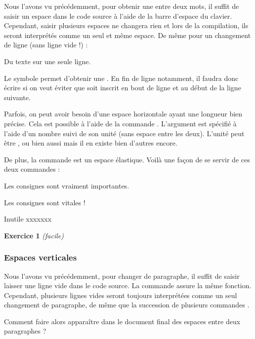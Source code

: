 Nous l'avons vu précédemment, pour obtenir une  entre deux mots, il suffit de saisir un espace dans le code source à l'aide de la barre d'espace du clavier. Cependant, saisir plusieurs espaces ne changera rien et lors de la compilation, ils seront interprétés comme un seul et même espace. De même pour un changement de ligne (sans ligne vide !) :\medskip

{\NewFont
\begin{SideBySideExample}[showspaces=true]
    Du texte
        sur une
    seule          ligne.
\end{SideBySideExample}
}

\begin{info}
    Le symbole \ordi{\~{}} permet d'obtenir une . En fin de ligne notamment, il faudra donc écrire  si on veut éviter que  soit inscrit en bout de ligne et  au début de la ligne suivante.
\end{info}

Parfois, on peut avoir besoin d'une espace horizontale ayant une longueur bien précise. Cela est possible à l'aide de la commande . L'argument  est spécifié à l'aide d'un nombre suivi de son unité (sans espace entre les deux). L'unité peut être ,  ou bien aussi  mais il en existe bien d'autres encore.\par
De plus, la commande  est un espace élastique. Voilà une façon de se servir de ces deux commandes :\bigskip

{\NewFont
\begin{SideBySideExample}
    Les consignes sont vraiment importantes.\par
    Les consignes sont \hspace{1.4cm} vitales !\par
    Inutile \hspace{-1.3cm} xxxxxxx\par
    \textbf{Exercice 1} \hfill \textit{(facile)}
\end{SideBySideExample}
\bigskip
}

\subsubsection{Espaces verticales}

Nous l'avons vu précédemment, pour changer de paragraphe, il suffit de saisir laisser une ligne vide dans le code source. La commande  assure la même fonction. Cependant, plusieurs lignes vides seront toujours interprétées comme un seul changement de paragraphe, de même que la succession de plusieurs commandes .\par
Comment faire alors apparaître dans le document final des espaces entre deux paragraphes ?

